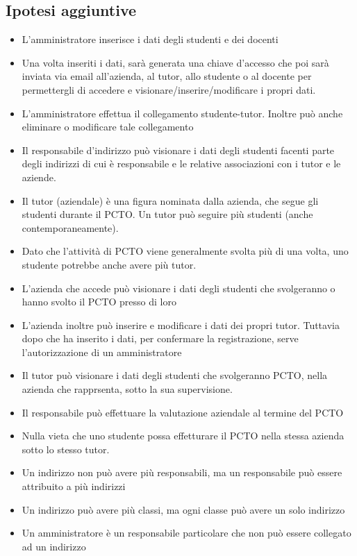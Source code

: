 \documentclass{article}
\begin{document}
\subsection{Ipotesi aggiuntive}
\begin{itemize}
    \item L'amministratore inserisce i dati degli studenti e dei docenti
    \item Una volta inseriti i dati, sarà generata una chiave d'accesso che poi sarà inviata via email all'azienda, al tutor, allo studente o al docente per permettergli di accedere e visionare/inserire/modificare i propri dati.
    \item L'amministratore effettua il collegamento studente-tutor. Inoltre può anche eliminare o modificare tale collegamento
    \item Il responsabile d'indirizzo può visionare i dati degli studenti facenti parte degli indirizzi di cui è responsabile e le relative associazioni con i tutor e le aziende.
    \item Il tutor (aziendale) è una figura nominata dalla azienda, che segue gli studenti durante il PCTO. Un tutor può seguire più studenti (anche contemporaneamente).
    \item Dato che l'attività di PCTO viene generalmente svolta più di una volta, uno studente potrebbe anche avere più tutor.
    \item L'azienda che accede può visionare i dati degli studenti che svolgeranno o hanno svolto il PCTO presso di loro
    \item L'azienda inoltre può inserire e modificare i dati dei propri tutor. Tuttavia dopo che ha inserito i dati, per confermare la registrazione, serve l'autorizzazione di un amministratore
    \item Il tutor può visionare i dati degli studenti che svolgeranno PCTO, nella azienda che rapprsenta, sotto la sua supervisione.
    \item Il responsabile può effettuare la valutazione aziendale al termine del PCTO
    \item Nulla vieta che uno studente possa effetturare il PCTO nella stessa azienda sotto lo stesso tutor.
    \item Un indirizzo non può avere più responsabili, ma un responsabile può essere attribuito a più indirizzi
    \item Un indirizzo può avere più classi, ma ogni classe può avere un solo indirizzo
    \item Un amministratore è un responsabile particolare che non può essere collegato ad un indirizzo
    
\end{itemize}
\end{document}
